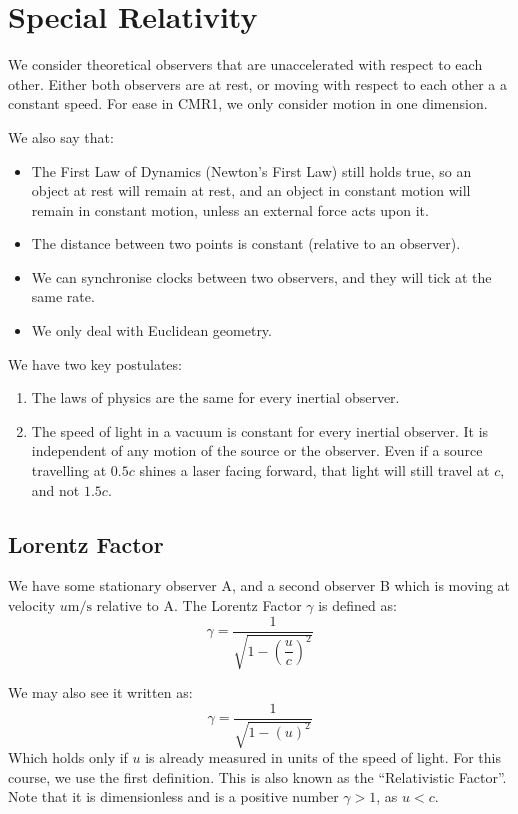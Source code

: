 
\section{Special Relativity}
We consider theoretical observers that are unaccelerated with respect to each other. Either both observers are at rest, or moving with respect to each other a a constant speed. For ease in CMR1, we only consider motion in one dimension.


We also say that:
\begin{itemize}
    \item The First Law of Dynamics (Newton's First Law) still holds true, so an object at rest will remain at rest, and an object in constant motion will remain in constant motion, unless an external force acts upon it. 
    \item The distance between two points is constant (relative to an observer).
    \item We can synchronise clocks between two observers, and they will tick at the same rate.
    \item We only deal with Euclidean geometry.
\end{itemize}

We have two key postulates:
\begin{enumerate}
    \item The laws of physics are the same for every inertial observer.
    \item The speed of light in a vacuum is constant for every inertial observer. It is independent of any motion of the source or the observer. Even if a source travelling at $0.5c$ shines a laser facing forward, that light will still travel at $c$, and not $1.5c$.
\end{enumerate}

\subsection{Lorentz Factor}
We have some stationary observer A, and a second observer B which is moving at velocity $u \text{m/s}$ relative to A. The Lorentz Factor $\gamma$ is defined as:
\[
    \gamma = \dfrac{1}{\sqrt{1 - \left(\dfrac{u}{c}\right)^2}}
\]

We may also see it written as:
\[
    \gamma = \dfrac{1}{\sqrt{1 - \left(u\right)^2}}
\]
Which holds only if $u$ is already measured in units of the speed of light. For this course, we use the first definition. This is also known as the ``Relativistic Factor''. Note that it is dimensionless and is a positive number $\gamma > 1$, as $u < c$.

